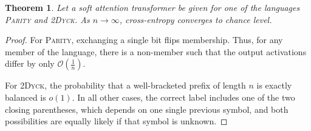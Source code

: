 \documentclass[11pt,a4paper]{article}
\newcounter{theorem}
\newtheorem{thm}[theorem]{Theorem}
\begin{document}
\begin{thm}
Let a soft attention transformer be given for one of the languages \textsc{Parity} and \textsc{2Dyck}. %
As $n\rightarrow\infty$, cross-entropy converges to chance level.
\end{thm}

\begin{proof}
For \textsc{Parity}, exchanging a single bit flips membership.
Thus, for any member of the language, there is a non-member such that the output activations differ by
only $\mathcal{O}(\frac{1}{n})$.

For \textsc{2Dyck}, the probability that a well-bracketed prefix of length $n$ is exactly balanced is $o(1)$.
In all other cases, the correct label includes one of the two closing parentheses, which depends on one single previous symbol, and both possibilities are equally likely if that symbol is unknown.
\end{proof}
\end{document}
